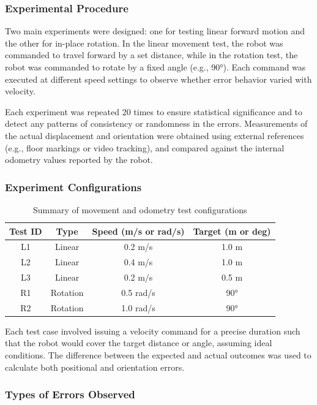 \documentclass[a4paper, 12pt]{article}
\begin{document}
    \subsubsection*{Experimental Procedure}

    Two main experiments were designed: one for testing linear forward motion and the other for in-place rotation. In the linear movement test, the robot was commanded to travel forward by a set distance, while in the rotation test, the robot was commanded to rotate by a fixed angle (e.g., 90°). Each command was executed at different speed settings to observe whether error behavior varied with velocity.

    Each experiment was repeated 20 times to ensure statistical significance and to detect any patterns of consistency or randomness in the errors. Measurements of the actual displacement and orientation were obtained using external references (e.g., floor markings or video tracking), and compared against the internal odometry values reported by the robot.

    \subsubsection*{Experiment Configurations}

    \begin{table}[H]
    \centering
    \begin{tabular}{|c|c|c|c|}
    \hline
    \textbf{Test ID} & \textbf{Type} & \textbf{Speed (m/s or rad/s)} & \textbf{Target (m or deg)} \\
    \hline
    L1 & Linear & 0.2 m/s & 1.0 m \\
    L2 & Linear & 0.4 m/s & 1.0 m \\
    L3 & Linear & 0.2 m/s & 0.5 m \\
    R1 & Rotation & 0.5 rad/s & 90° \\
    R2 & Rotation & 1.0 rad/s & 90° \\
    \hline
    \end{tabular}
    \caption{Summary of movement and odometry test configurations}
    \end{table}

    Each test case involved issuing a velocity command for a precise duration such that the robot would cover the target distance or angle, assuming ideal conditions. The difference between the expected and actual outcomes was used to calculate both positional and orientation errors.

    \subsubsection*{Types of Errors Observed}
\end{document}
